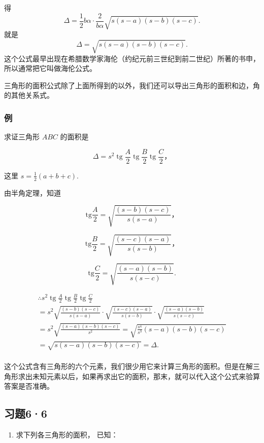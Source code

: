 得
\[
\Delta = \frac{1}{2} b\alpha \cdot \frac{2}{b\alpha}\sqrt{s(s - a)(s - b)(s - c)}.
\]
就是
\[
\Delta = \sqrt{s(s - a)(s - b)(s - c)}.
\]
这个公式最早出现在希腊数学家海伦（约纪元前三世纪到前二世纪）所著的书申，所以通常把它叫做海伦公式。

三角形的面积公式除了上面所得到的以外，我们还可以导出三角形的面积和边，角的其他关系式。

\subsubsection{例}

求证三角形 \(ABC\) 的面积是

\[
\Delta = s ^ {2} \operatorname{tg} \frac {A}{2} \operatorname{tg} \frac {B}{2} \operatorname{tg} \frac {C}{2}\text{，}
\]

这里 \(s = \frac{1}{2} (a + b + c)\).

 由半角定理，知道

\[
\mathrm{tg} \frac {A}{2} = \sqrt {\frac {(s - b) (s - c)}{s (s - a)}}\text{，}
\]

\[
\mathrm{tg} \frac {B}{2} = \sqrt {\frac {(s - c) (s - a)}{s (s - b)}}\text{，}
\]

\[
\mathrm{tg} \frac {C}{2} = \sqrt {\frac {(s - a) (s - b)}{s (s - c)}}.
\]

\[
\begin{array}{l} \therefore s ^ {2} \operatorname{tg} \frac {A}{2} \operatorname{tg} \frac {B}{2} \operatorname{tg} \frac {C}{2} \\ = s ^ {2} \sqrt {\frac {(s - b) (s - c)}{s (s - a)}} \cdot \sqrt {\frac {(s - c) (s - a)}{s (s - b)}} \cdot \sqrt {\frac {(s - a) (s - b)}{s (s - c)}} \\ = s ^ {2} \sqrt {\frac {(s - a) (s - b) (s - c)}{s ^ {2}}} = \sqrt {\frac {s ^ {4}}{s ^ {3}} (s - a) (s - b) (s - c)} \\ = \sqrt {s (s - a) (s - b) (s - c)} = \Delta . \\ \end{array}
\]

这个公式含有三角形的六个元素，我们很少用它来计算三角形的面积。但是在解三角形求出未知元素以后，如果再求出它的面积，那末，就可以代入这个公式来验算答案是否准确。

\subsection{习题6·6}

\begin{enumerate}
\item
  求下列各三角形的面积， 已知：
\end{enumerate}


